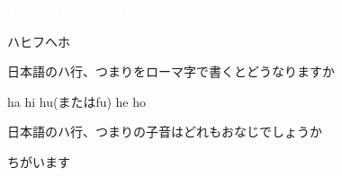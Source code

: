 \documentclass[aspectratio=169,xcolor={dvipsnames,table}]{beamer}
\begin{document}
\begin{frame}
\centering
  \textcolor{white}{\Huge\bfseries Today's Pronunciation}\pause

 \vspace{30pt}

  \textcolor{white}{\Huge\bfseries {}}
\vfill


\end{frame}
\begin{frame}[plain]{ハヒフヘホ}

\begin{description}
 \item<1->[Question 1] 日本語のハ行、つまりをローマ字で書くとどうなりますか
 \item<2->[Answer 1] ha\hspace{10pt} hi\hspace{10pt} hu(またはfu)\hspace{10pt} he\hspace{10pt} ho
\end{description}

\bigskip

\begin{description}
 \item<3->[Question 2] 日本語のハ行、つまりの子音はどれもおなじでしょうか
 \item<4->[Answer 2] ちがいます\\
 \end{description} 

\bigskip

\hfill{}

\end{frame}
\end{document}
